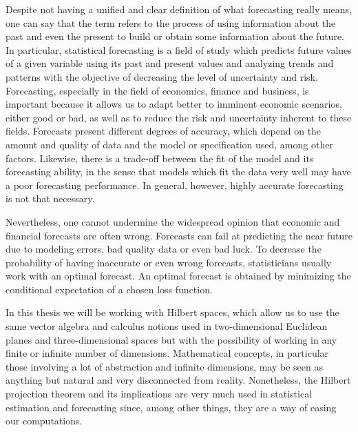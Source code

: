 \documentclass{article}
\begin{document}
Despite not having a unified and clear definition of what forecasting really means, one can say that the term refers to the process of using information about the past and even the present to build or obtain some information about the future. In particular, statistical forecasting is a field of study which predicts future values of a given variable using its past and present values and analyzing trends and patterns with the objective of decreasing the level of uncertainty and risk. Forecasting, especially in the field of economics, finance and business, is important because it allows us to adapt better to imminent economic scenarios, either good or bad, as well as to reduce the risk and uncertainty inherent to these fields. Forecasts present different degrees of accuracy, which depend on the amount and quality of data and the model or specification used, among other factors. Likewise, there is a trade-off between the fit of the model and its forecasting ability, in the sense that models which fit the data very well may have a poor forecasting performance. In general, however, highly accurate forecasting is not that necessary. \newline

Nevertheless, one cannot undermine the widespread opinion that economic and financial forecasts are often wrong. Forecasts can fail at predicting the near future due to modeling errors, bad quality data or even bad luck. To decrease the probability of having inaccurate or even wrong forecasts, statisticians usually work with an optimal forecast. An optimal forecast is obtained by minimizing the conditional expectation of a chosen loss function. \newline

In this thesis we will be working with Hilbert spaces, which allow us to use the same vector algebra and calculus notions used in two-dimensional Euclidean planes and three-dimensional spaces but with the possibility of working in any finite or infinite number of dimensions. Mathematical concepts, in particular those involving a lot of abstraction and infinite dimensions, may be seen as anything but natural and very disconnected from reality. Nonetheless, the Hilbert projection theorem and its implications are very much used in statistical estimation and forecasting since, among other things, they are a way of easing our computations. \newline
\end{document}

